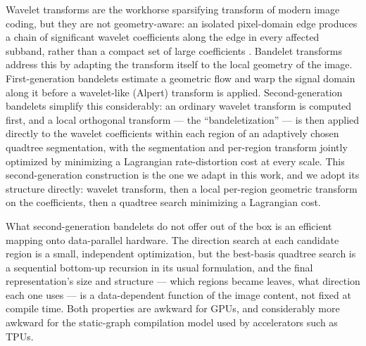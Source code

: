 \documentclass[11pt]{article}
\begin{document}
Wavelet transforms are the workhorse sparsifying transform of modern image
coding, but they are not geometry-aware: an isolated pixel-domain edge
produces a chain of significant wavelet coefficients along the edge in every
affected subband, rather than a compact set of large coefficients
\citep{mallat2008wavelet}. Bandelet transforms address this by adapting the
transform itself to the local geometry of the image. First-generation
bandelets \citep{lepennec2005sparse} estimate a geometric flow and warp the
signal domain along it before a wavelet-like (Alpert) transform is applied.
Second-generation bandelets \citep{peyre2005surface,peyre2005discrete}
simplify this considerably: an ordinary wavelet transform is computed first,
and a local orthogonal transform --- the ``bandeletization'' --- is then
applied directly to the wavelet coefficients within each region of an
adaptively chosen quadtree segmentation, with the segmentation and per-region
transform jointly optimized by minimizing a Lagrangian rate-distortion cost
at every scale. This second-generation construction is the one we adapt in
this work, and we adopt its structure directly: wavelet transform, then a
local per-region geometric transform on the coefficients, then a
quadtree search minimizing a Lagrangian cost.

What second-generation bandelets do not offer out of the box is an efficient
mapping onto data-parallel hardware. The direction search at each candidate
region is a small, independent optimization, but the best-basis quadtree
search is a sequential bottom-up recursion in its usual formulation, and the
final representation's size and structure --- which regions became leaves,
what direction each one uses --- is a data-dependent function of the image
content, not fixed at compile time. Both properties are awkward for GPUs, and
considerably more awkward for the static-graph compilation model used by
accelerators such as TPUs.
\end{document}
